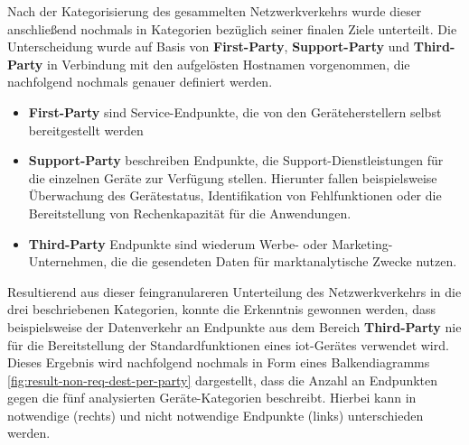 \noindent Nach der Kategorisierung des gesammelten Netzwerkverkehrs wurde dieser anschließend nochmals in Kategorien bezüglich seiner finalen Ziele unterteilt. Die Unterscheidung wurde auf Basis von \textbf{First-Party}, \textbf{Support-Party} und \textbf{Third-Party} in Verbindung mit den aufgelösten Hostnamen vorgenommen, die nachfolgend nochmals genauer definiert werden.

\begin{itemize}
	\item \textbf{First-Party} sind Service-Endpunkte, die von den Geräteherstellern selbst bereitgestellt werden
	\item \textbf{Support-Party} beschreiben Endpunkte, die Support-Dienstleistungen für die einzelnen Geräte zur Verfügung stellen. Hierunter fallen beispielsweise Überwachung des Gerätestatus, Identifikation von Fehlfunktionen oder die Bereitstellung von Rechenkapazität für die Anwendungen.
	\item \textbf{Third-Party} Endpunkte sind wiederum Werbe- oder Marketing-Unternehmen, die die gesendeten Daten für marktanalytische Zwecke nutzen.
\end{itemize}

\noindent Resultierend aus dieser feingranulareren Unterteilung des Netzwerkverkehrs in die drei beschriebenen Kategorien, konnte die Erkenntnis gewonnen werden, dass beispielsweise der Datenverkehr an Endpunkte aus dem Bereich \textbf{Third-Party} nie für die Bereitstellung der Standardfunktionen eines \ac{iot}-Gerätes verwendet wird. 
Dieses Ergebnis wird nachfolgend nochmals in Form eines Balkendiagramms \ref{fig:result-non-req-dest-per-party} dargestellt, dass die Anzahl an Endpunkten gegen die fünf analysierten Geräte-Kategorien beschreibt. Hierbei kann in notwendige (rechts) und nicht notwendige Endpunkte (links) unterschieden werden. 


